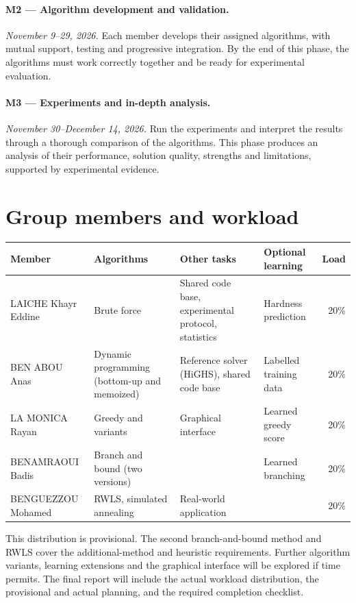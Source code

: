 \documentclass[a4paper,11pt]{article}
\renewcommand{\arraystretch}{1.15}
\begin{document}
\paragraph{M2 --- Algorithm development and validation.}
\textit{November 9--29, 2026.}
Each member develops their assigned algorithms, with mutual support, testing and progressive integration. By the end of this phase, the algorithms must work correctly together and be ready for experimental evaluation.

\paragraph{M3 --- Experiments and in-depth analysis.}
\textit{November 30--December 14, 2026.}
Run the experiments and interpret the results through a thorough comparison of the algorithms. This phase produces an analysis of their performance, solution quality, strengths and limitations, supported by experimental evidence.

\section{Group members and workload}

\begin{table}[H]
\centering
\small
\renewcommand{\arraystretch}{1.2}
\setlength{\extrarowheight}{2pt}
\begin{tabularx}{\textwidth}{|l|L|L|L|r|}
\hline
\textbf{Member} & \textbf{Algorithms} & \textbf{Other tasks} & \textbf{Optional learning} & \textbf{Load} \\
\hline
LAICHE Khayr Eddine & Brute force & Shared code base, experimental protocol, statistics & Hardness prediction & 20\% \\
\hline
BEN ABOU Anas & Dynamic programming (bottom-up and memoized) & Reference solver (HiGHS), shared code base & Labelled training data & 20\% \\
\hline
LA MONICA Rayan & Greedy and variants & Graphical interface & Learned greedy score & 20\% \\
\hline
BENAMRAOUI Badis & Branch and bound (two versions) & & Learned branching & 20\% \\
\hline
BENGUEZZOU Mohamed & RWLS, simulated annealing & Real-world application & & 20\% \\
\hline
\end{tabularx}
\end{table}

This distribution is provisional. The second branch-and-bound method and RWLS cover the additional-method and heuristic requirements. Further algorithm variants, learning extensions and the graphical interface will be explored if time permits. The final report will include the actual workload distribution, the provisional and actual planning, and the required completion checklist.
\end{document}
